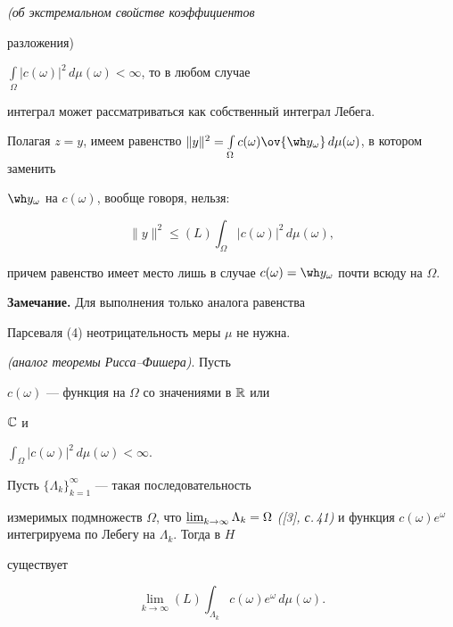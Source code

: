\begin{assrt} {\em (об экстремальном свойстве коэффициентов


разложения)}
$\int\limits_\Omega |c(\omega)|^2\,d\mu(\omega)<\infty$, то в любом случае


интеграл может рассматриваться как собственный интеграл Лебега.


Полагая $z=y$, имеем равенство $\|y\|^2=\int\limits_\Omega c(\omega


)\ov{\wh y_\omega}\,d\mu(\omega)$, в котором заменить


$\wh y_\omega$ на $c(\omega)$, вообще говоря, нельзя$:$


$$


\|y\|^2\leqslant(L)\int_\Omega|c(\omega)|^2\,d\mu(\omega),


$$


причем равенство имеет место лишь в случае $c(\omega)=\wh


y_\omega$ почти всюду на $\Omega$.


\end{assrt}





{\bf Замечание.} Для выполнения только аналога равенства


Парсеваля (4) неотрицательность меры $\mu$ не нужна.





\begin{assrt} {\em (аналог теоремы Рисса--Фишера)}. Пусть


$c(\omega)$ --- функция на $\Omega$ со значениями в $\Bbb R$ или


$\Bbb C$ и %


$\int_\Omega|c(\omega)|^2\,d\mu(\omega)<\infty$.


Пусть ${\{\Lambda_k}\}^\infty_{k=1}$ --- такая последовательность


измеримых подмножеств $\Omega$, что $\varliminf_{k\to\infty} %


{\Lambda_k}=\Omega$ {\em ([3], с.\,41)} и функция $c(\omega


)e^\omega$ интегрируема по Лебегу на $\Lambda_k$. Тогда в $H$


существует


$$


\lim_{k\to\infty}(L)\int_{\Lambda_k}c(\omega)e^\omega\,d\mu(\omega).


$$


\end{assrt}





